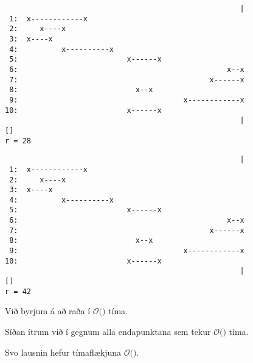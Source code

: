 { \begin{verbatim}
                                                      |
 1:  x------------x
 2:     x----x
 3:  x----x                    
 4:          x----------x
 5:                         x------x
 6:                                                x--x
 7:                                            x------x
 8:                           x--x
 9:                                      x------------x
10:                         x------x
                                                      |
[]
r = 28
\end{verbatim} }

{ \begin{verbatim}
                                                      |
 1:  x------------x
 2:     x----x
 3:  x----x                    
 4:          x----------x
 5:                         x------x
 6:                                                x--x
 7:                                            x------x
 8:                           x--x
 9:                                      x------------x
10:                         x------x
                                                      |
[]
r = 42
\end{verbatim} }

{
	\only<all:1>{\lineAA}
	\only<all:2>{\lineAB}
	\only<all:3>{\lineAC}
	\only<all:4>{\lineAD}
	\only<all:5>{\lineAE}
	\only<all:6>{\lineAF}
	\only<all:7>{\lineAG}
	\only<all:8>{\lineAH}
	\only<all:9>{\lineAI}
	\only<all:10>{\lineAJ}
	\only<all:11>{\lineAK}
	\only<all:12>{\lineAL}
	\only<all:13>{\lineAM}
	\only<all:14>{\lineAN}
	\only<all:15>{\lineAO}
	\only<all:16>{\lineAP}
	\only<all:17>{\lineAQ}
	\only<all:18>{\lineAR}
	\only<all:19>{\lineAS}
	\only<all:20>{\lineAU}
	\only<all:21>{\lineAV}
	\only<all:22>{\lineAW}
	\only<all:23>{\lineAX}
	\only<all:24>{\lineAY}
	\only<all:25>{\lineAZ}
	\only<all:26>{\lineBA}
	\only<all:27>{\lineBB}
	\only<all:28>{\lineBC}
	\only<all:29>{\lineBD}
	\only<all:30>{\lineBDD}
	\only<all:31>{\lineBE}
	\only<all:32>{\lineBF}
	\only<all:33>{\lineBG}
	\only<all:34>{\lineBH}
	\only<all:35>{\lineBI}
	\only<all:36>{\lineBJ}
	\only<all:37>{\lineBK}
	\only<all:38>{\lineBL}
}

{
}

{
	{
		\item<1-> Við byrjum á að raða í $\mathcal{O}($$)$ tíma.
		\item<3-> Síðan ítrum við í gegnum alla endapunktana sem tekur $\mathcal{O}($$)$ tíma.
		\item<5-> Svo lausnin hefur tímaflækjuna $\mathcal{O}($\onslide<6->{$n \log n$}$)$.
	}
}

{
}


